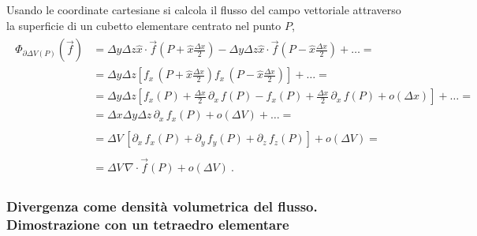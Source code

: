 \documentclass[letterpaper,10pt,italian]{jupyterBook}
\begin{document}
\sphinxAtStartPar
Usando le coordinate cartesiane si calcola il flusso del campo vettoriale attraverso la superficie di un cubetto elementare centrato nel punto \(P\), 
\begin{equation*}
\begin{split}\begin{aligned}
  \Phi_{\partial \Delta V(P)}\left(\vec{f}\right) 
  & = \Delta y \Delta z \hat{x} \cdot \vec{f}\left(P+\hat{x} \frac{\Delta x}{2} \right)
    - \Delta y \Delta z \hat{x} \cdot \vec{f}\left(P-\hat{x} \frac{\Delta x}{2} \right) + \dots = \\
  & = \Delta y \Delta z \left[ f_x \, \left(P+\hat{x} \frac{\Delta x}{2} \right)
                               f_x \, \left(P-\hat{x} \frac{\Delta x}{2} \right) \right] + \dots = \\
  & = \Delta y \Delta z \left[ f_x(P) + \frac{\Delta x}{2} \,  \partial_x \, f(P) 
                             - f_x(P) + \frac{\Delta x}{2} \,  \partial_x \, f(P) + o(\Delta x) \right] + \dots  = \\
  & = \Delta x \Delta y \Delta z \,  \partial_x \, f_x(P) + o(\Delta V) + \dots = \\ \\
  & = \Delta V \, \left[  \partial_x \, f_x(P) +  \partial_y \, f_y(P) + \partial_z \, f_z(P) \right] + o(\Delta V) = \\ \\
  & = \Delta V \, \nabla \cdot \vec{f}(P) + o(\Delta V) \ .
\end{aligned}\end{split}
\end{equation*}\subsubsection*{Divergenza come densità volumetrica del flusso. Dimostrazione con un tetraedro elementare}
\end{document}

